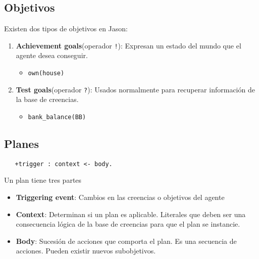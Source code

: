 \subsection{Objetivos}

{Existen dos tipos de objetivos en Jason:\ns
\begin{enumerate}
	\item \textbf{Achievement goals}(operador \lstinline|!|): Expresan un estado del
mundo que el agente desea conseguir.
   \begin{itemize}
      \item \lstinline|own(house)|
   \end{itemize}
	\item \textbf{Test goals}(operador \lstinline|?|): Usados normalmente para recuperar información de la base de creencias.
   \begin{itemize}
      \item \lstinline|bank_balance(BB)|
   \end{itemize}
\end{enumerate}
}

\subsection{Planes}
\begin{lstlisting}
   +trigger : context <- body.
\end{lstlisting}


{Un plan tiene tres partes\ns
\begin{itemize}
	\item \textbf{Triggering event}: Cambios en las creencias o objetivos del agente
	\item \textbf{Context}: Determinan si un plan es aplicable. Literales que deben ser una consecuencia lógica de
   la base de creencias para que el plan se instancie.
	\item \textbf{Body}: Sucesión de acciones que comporta el plan. Es una secuencia de acciones. Pueden existir nuevos subobjetivos.
\end{itemize}}


